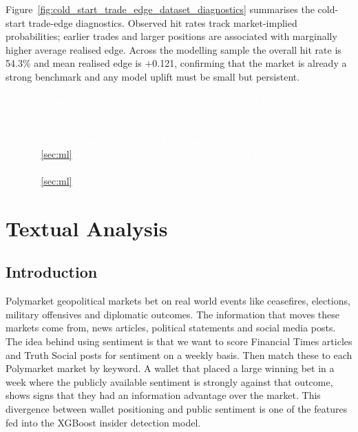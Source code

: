 \documentclass[11pt,a4paper]{article}
\newcommand{\edit}[1]{#1}
\newcommand{\WhaleQuadrantCount}{\edit{1{,}422}}
\newcommand{\WhaleCountCI}{\edit{[1{,}349,\,1{,}493]}}
\newcommand{\AllWalletMeanEdge}{\edit{0.121}}
\newcommand{\WhaleSurvivalPct}{\edit{65.0}}
\begin{document}
Figure~\ref{fig:cold_start_trade_edge_dataset_diagnostics} summarises the cold-start trade-edge diagnostics. Observed hit rates track market-implied probabilities; earlier trades and larger positions are associated with marginally higher average realised edge. Across the modelling sample the overall hit rate is 54.3\% and mean realised edge is $+$\AllWalletMeanEdge, confirming that the market is already a strong benchmark and any model uplift must be small but persistent.

\vspace{1em}
\begin{mdframed}[linewidth=0.6pt, backgroundcolor=ucdblue]
\vspace{0.5em}
\textcolor{white}{\edit{Potentially informed activity on Polymarket is concentrated in \WhaleQuadrantCount\ wallets that are simultaneously large, accurate, early, and topic-skewed (bootstrap 95\% CI on the count: \WhaleCountCI). In the saved EDA notebook, \WhaleSurvivalPct\% of these whale-quadrant wallets remain active after 1 September 2025, which is why the Section~\ref{sec:ml} validation scheme is wallet-disjoint rather than random. Volume, hit rate, timing, and tag concentration each map onto a feature family used in Section~\ref{sec:ml}.}}
\vspace{0.5em}
\end{mdframed}


\newpage
\section{Textual Analysis}

\subsection{Introduction}

Polymarket geopolitical markets bet on real world events like ceasefires, 
elections, military offensives and diplomatic outcomes. The information that 
moves these markets come from, news articles, political statements and 
social media posts.\\

The idea behind using sentiment is that we want to
score Financial Times articles and Truth Social posts for sentiment on a 
weekly basis. Then match these to each Polymarket market by keyword. A wallet that 
placed a large winning bet in a week where the publicly available sentiment 
is strongly against that outcome, shows signs that they had an information advantage over the market. This divergence between wallet 
positioning and public sentiment is one of the features fed into the XGBoost 
insider detection model.\\
\end{document}
